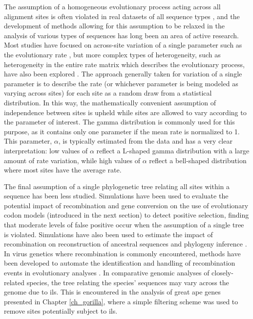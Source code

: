 The assumption of a homogeneous evolutionary process acting across all
alignment sites is often violated in real datasets of all sequence
types \citep{Yang2006,Whelan2008}, and the development of methods
allowing for this assumption to be relaxed in the analysis of various
types of sequences has long been an area of active research. Most
studies have focused on across-site variation of a single parameter
such as the evolutionary rate
\citep{Uzzell1971,Yang1994c,Yang1996,Nielsen1998}, but more complex
types of heterogeneity, such as heterogeneity in the entire rate
matrix which describes the evolutionary process, have also been
explored \citep{Lartillot2004} . The approach generally taken for
variation of a single parameter is to describe the rate (or whichever
parameter is being modeled as varying across sites) for each site as a
random draw from a statistical distribution. In this way, the
mathematically convenient assumption of independence between sites is
upheld while sites are allowed to vary according to the parameter of
interest. The gamma distribution is commonly used for this purpose, as
it contains only one parameter if the mean rate is normalized to
1. This parameter, $\alpha$, is typically estimated from the data and
has a very clear interpretation: low values of $\alpha$ reflect a
L-shaped gamma distribution with a large amount of rate variation,
while high values of $\alpha$ reflect a bell-shaped distribution where
most sites have the average rate.

The final assumption of a single phylogenetic tree relating all sites
within a sequence has been less studied. Simulations have been used to
evaluate the potential impact of recombination
\citet{Anisimova2003,Shriner2003} and gene conversion
\citet{Casola2009} on the use of evolutionary codon models (introduced
in the next section) to detect positive selection, finding that
moderate levels of false positive occur when the assumption of a
single tree is violated. Simulations have also been used to estimate
the impact of recombination on reconstruction of ancestral sequences
\citep{Busto2010} and phylogeny inference \citep{Schierup2000}. In
virus genetics where recombination is commonly encountered, methods
have been developed to automate the identification and handling of
recombination events in evolutionary analyses \citep{Pond2006}. In
comparative genomic analyses of closely-related species, the tree
relating the species' sequences may vary across the genome due to
\ac{ils}. This is encountered in the analysis of great ape genes
presented in Chapter \ref{ch_gorilla}, where a simple filtering scheme
was used to remove sites potentially subject to \ac{ils}.

